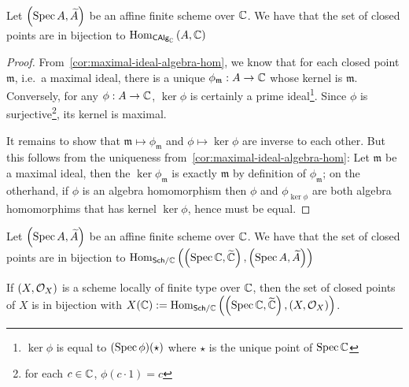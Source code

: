 \begin{proposition}\label{thm:affine-scheme-closed-points-biject-algebra-hom}
  Let $\left(\operatorname*{Spec}{A}, \widetilde{A}\right)$ be an affine finite scheme over $\mathbb{C}$. We have that the set of closed points are in bijection to
  $\operatorname{Hom}_{\mathsf{CAlg}_{\mathbb{C}}}\left(A, \mathbb{C}\right)$
\end{proposition}

\begin{proof}
  From~\cref{cor:maximal-ideal-algebra-hom}, we know that for each closed point $\mathfrak m$, i.e.\ a maximal ideal, there is a unique $\phi_{\mathfrak m} : A \to \mathbb{C}$ whose kernel is $\mathfrak m$. Conversely, for any $\phi: A \to \mathbb{C}$, $\ker \phi$ is certainly a prime ideal\footnote{$\ker \phi$ is equal to $(\operatorname{Spec} \phi)(\star)$ where $\star$ is the unique point of $\operatorname{Spec}\mathbb{C}$}. Since $\phi$ is surjective\footnote{for each $c \in \mathbb{C}$, $\phi(c \cdot 1) = c$}, its kernel is maximal.


  It remains to show that $\mathfrak m \mapsto \phi_{\mathfrak{m}}$ and $\phi \mapsto \ker \phi$ are inverse to each other. But this follows from the uniqueness from~\cref{cor:maximal-ideal-algebra-hom}:
  Let $\mathfrak{m}$ be a maximal ideal, then the $\ker \phi_{\mathfrak{m}}$ is exactly $\mathfrak m$ by definition of $\phi_{\mathfrak m}$;
  on the otherhand, if $\phi$ is an algebra homomorphism then $\phi$ and $\phi_{\ker \phi}$ are both algebra homomorphims that has kernel $\ker \phi$, hence must be equal.
\end{proof}

\begin{corollary}\label{cor:affine-closed-point-bijection-scheme-morphism}
  Let $\left(\operatorname*{Spec}{A}, \widetilde{A}\right)$ be an affine finite scheme over $\mathbb{C}$. We have that the set of closed points are in bijection to $\operatorname{Hom}_{\mathsf{Sch}/\mathbb{C}}{\left(\left(\operatorname*{Spec}{\mathbb{C}}, \widetilde{\mathbb{C}}\right), \left(\operatorname*{Spec}{A}, \widetilde{A}\right)\right)}$
\end{corollary}

\begin{proposition}
  If $\left(X, \mathcal{O}_{X}\right)$ is a scheme locally of finite type over $\mathbb{C}$, then the set of closed points of $X$ is in bijection with $X(\mathbb{C}) := \operatorname{Hom}_{\mathsf{Sch}/\mathbb{C}}\left(\left(\operatorname*{Spec}{\mathbb{C}}, \widetilde{\mathbb{C}}\right), \left(X, \mathcal{O}_{X}\right)\right)$.
\end{proposition}


